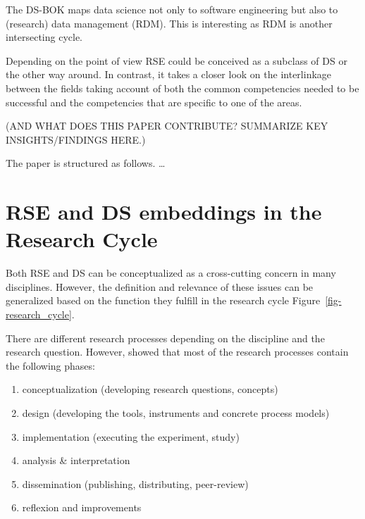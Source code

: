 \documentclass[
        english,biblatex
    ]{lni}
\providecommand{\tightlist}{%
    \setlength{\itemsep}{0pt}\setlength{\parskip}{0pt}}
\begin{document}
    The DS-BOK maps data science not only to software engineering but
    also to (research) data management (RDM). This is interesting as RDM
    is another intersecting cycle.

    Depending on the point of view RSE could be conceived as a subclass
    of DS or the other way around. In contrast, it takes a closer look
    on the interlinkage between the fields taking account of both the
    common competencies needed to be successful and the competencies
    that are specific to one of the areas.

    (AND WHAT DOES THIS PAPER CONTRIBUTE? SUMMARIZE KEY
    INSIGHTS/FINDINGS HERE.)

    The paper is structured as follows. \ldots{}

    \section{RSE and DS embeddings in the Research
    Cycle}\label{rse-and-ds-embeddings-in-the-research-cycle}

    Both RSE and DS can be conceptualized as a cross-cutting concern in
    many disciplines. However, the definition and relevance of these
    issues can be generalized based on the function they fulfill in the
    research cycle Figure~\ref{fig-research_cycle}.

    There are different research processes depending on the discipline
    and the research question. However, \autocite{Dehne2021} showed that
    most of the research processes contain the following phases:

    \begin{enumerate}
    \def\labelenumi{\arabic{enumi}.}
    \tightlist
    \item
      conceptualization (developing research questions, concepts)
    \item
      design (developing the tools, instruments and concrete process
      models)
    \item
      implementation (executing the experiment, study)
    \item
      analysis \& interpretation
    \item
      dissemination (publishing, distributing, peer-review)
    \item
      reflexion and improvements
    \end{enumerate}
\end{document}
